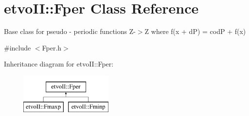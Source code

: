 \hypertarget{classetvo_i_i_1_1_fper}{}\section{etvo\+II\+:\+:Fper Class Reference}
\label{classetvo_i_i_1_1_fper}


Base class for pseudo -\/ periodic functions Z-\/$>$Z where f(x + dP) = codP + f(x)  




{\ttfamily \#include $<$Fper.\+h$>$}

Inheritance diagram for etvo\+II\+:\+:Fper\+:\begin{figure}[H]
\begin{center}
\leavevmode
\includegraphics[height=2.000000cm]{classetvo_i_i_1_1_fper}
\end{center}
\end{figure}

